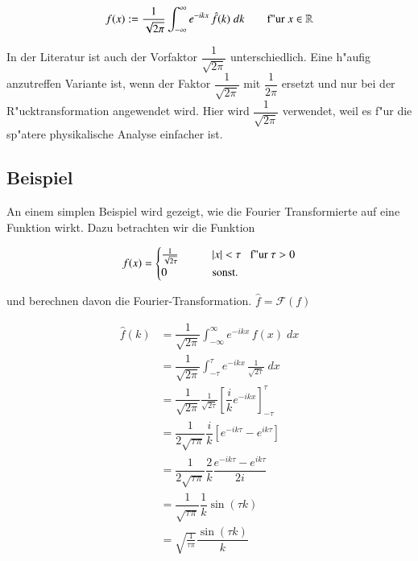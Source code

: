 \begin{refsection}
\begin{equation}
f(x) := \dfrac{1}{\sqrt{2\pi}}\int_{-\infty}^{\infty}e^{-i k x} \, \hat{f}(k) \; dk \qquad \textnormal{f"ur } x \in \mathbb{R}
\end{equation}

In der Literatur ist auch der Vorfaktor $\dfrac{1}{\sqrt{2\pi}}$ unterschiedlich. Eine h"aufig anzutreffen Variante ist, wenn der Faktor $\dfrac{1}{\sqrt{2\pi}}$ mit $\dfrac{1}{2\pi}$ ersetzt und nur bei der R"ucktransformation angewendet wird. Hier wird $\dfrac{1}{\sqrt{2\pi}}$ verwendet, weil es f"ur die sp"atere physikalische Analyse einfacher ist.\\

\subsection{Beispiel}

An einem simplen Beispiel wird gezeigt, wie die Fourier Transformierte auf eine Funktion wirkt. Dazu betrachten wir die Funktion

\begin{equation}
f(x)=\begin{cases}
    \frac{1}{\sqrt{2\tau}}       & \qquad |x|< \tau \;\;\; \textnormal{f"ur }  \tau > 0\\
    0  & \qquad\text{sonst.}\\
  \end{cases}
\end{equation}


und berechnen davon die Fourier-Transformation. $\hat{f}=\mathcal{F}(f)$

\begin{align}
\hat{f}(k)
&=\dfrac{1}{\sqrt{2\pi}}\int_{-\infty}^{\infty}e^{-i k x} \, f(x) \; dx\\
&=\dfrac{1}{\sqrt{2\pi}}\int_{-\tau}^{\tau}e^{-i k x} \, \frac{1}{\sqrt{2\tau}} \; dx\\
&=\dfrac{1}{\sqrt{2\pi}}\frac{1}{\sqrt{2\tau}}\left[ \dfrac{i}{k}e^{-ik x}\right]_{-\tau}^{\tau}\\
&=\dfrac{1}{2\sqrt{\tau\pi}}\dfrac{i}{k}\left[e^{-ik \tau} - e^{ik \tau}\right]\\
&=\dfrac{1}{2\sqrt{\tau\pi}}\dfrac{2}{k}\dfrac{e^{-ik \tau} - e^{ik \tau}}{2i}\\
&=\dfrac{1}{\sqrt{\tau\pi}}\dfrac{1}{k}\sin(\tau k)\\
&=\sqrt{\frac{1}{\tau\pi}}\dfrac{\sin(\tau k)}{k}
\end{align}


\end{refsection}
